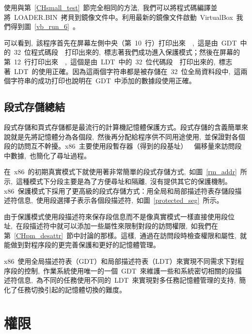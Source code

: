 使用與第~\ref{CHsmall_test}~節完全相同的方法,~我們可以將程式碼編譯並將~LOADER.BIN~拷貝到鏡像文件中。利用最新的鏡像文件啟動~VirtualBox~我們得到圖~\ref{vb_run_6}~。


可以看到,~該程序首先在屏幕左側中央（第~10~行）打印出來~~,~這是由~GDT~中的~32~位程式碼段~~打印出來的,~標志著我們成功進入保護模式；然後在屏幕的第~12~行打印出來~~,~這個是由~LDT~中的~32~位代碼段~~打印出來的,~標志著~LDT~的使用正確。因為這兩個字符串都是被存儲在~32~位全局資料段中,~這兩個字符串的成功打印也說明在~GDT~中添加的數據段使用正確。

\subsection{段式存儲總結}

段式存儲和頁式存儲都是最流行的計算機記憶體保護方式。段式存儲的含義簡單來說就是先將記憶體分為各個段,~然後再分配給程序供不同用途使用,~並保證對各個段的訪問互不幹擾。x86~主要使用段暫存器（得到的段基址）~\code{+}~偏移量來訪問段中數據,~也簡化了尋址過程。

在~x86~的初期真實模式下就使用著非常簡單的段式存儲方式,~如圖~\ref{rm_addr}~所示,~這種模式下分段主要是為了方便尋址和隔離,~沒有提供其它的保護機制。x86~保護模式下採用了更高級的段式存儲方式：用全局和局部描述符表存儲段描述符信息,~使用段選擇子表示各個段描述符,~如圖~\ref{protected_seg}~所示。

由于保護模式使用段描述符來保存段信息而不是像真實模式一樣直接使用段位址,~在段描述符中就可以添加一些屬性來限制對段的訪問權限,~如我們在第~\ref{CHpm_desattr}~節中討論的那樣。這樣,~通過在訪問段時檢查權限和屬性,~就能做到對程序段的更完善保護和更好的記憶體管理。

x86~使用全局描述符表（GDT）和局部描述符表（LDT）來實現不同需求下對程序段的控制,~作業系統使用唯一的一個~GDT~來維護一些和系統密切相關的段描述符信息,~為不同的任務使用不同的~LDT~來實現對多任務記憶體管理的支持,~簡化了任務切換引起的記憶體切換的難度。

\section{權限}



